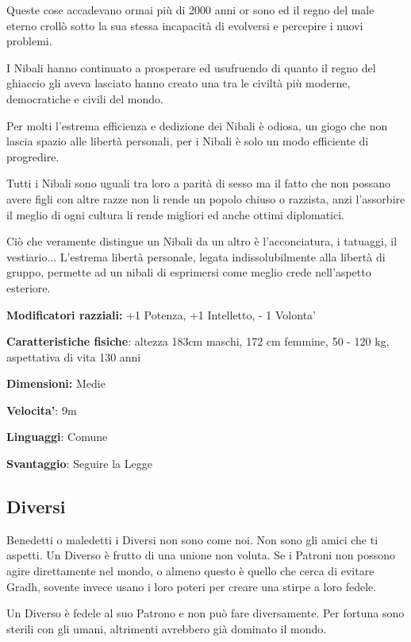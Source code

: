 \documentclass[a4paper,11pt,twoside,openany]{book}
\begin{document}
Queste cose accadevano ormai più di 2000 anni or sono ed il regno del male eterno crollò sotto la sua stessa incapacità di evolversi e percepire i nuovi problemi.

I Nibali hanno continuato a prosperare ed usufruendo di quanto il regno del ghiaccio gli aveva lasciato hanno creato una tra le civiltà più moderne, democratiche e civili del mondo.

Per molti l'estrema efficienza e dedizione dei Nibali è odiosa, un giogo che non lascia spazio alle libertà personali, per i Nibali è solo un modo efficiente di progredire.

Tutti i Nibali sono uguali tra loro a parità di sesso ma il fatto che non possano avere figli con altre razze non li rende un popolo chiuso o razzista, anzi l'assorbire il meglio di ogni cultura li rende migliori ed anche ottimi diplomatici.

Ciò che veramente distingue un Nibali da un altro è l'acconciatura, i tatuaggi, il vestiario... L'estrema libertà personale, legata indissolubilmente alla libertà di gruppo, permette ad un nibali di esprimersi come meglio crede nell'aspetto esteriore.

\textbf{Modificatori razziali:} +1 Potenza, +1 Intelletto, - 1 Volonta'

\textbf{Caratteristiche fisiche}: altezza 183cm maschi, 172 cm femmine, 50 - 120 kg, aspettativa di vita 130 anni

\textbf{Dimensioni:} Medie

\textbf{Velocita'}: 9m

\textbf{Linguaggi}: Comune

\textbf{Svantaggio}: Seguire la Legge

\subsection{Diversi}

\label{diversi}

Benedetti o maledetti i Diversi non sono come noi. Non sono gli amici che ti aspetti. Un Diverso è frutto di una unione non voluta. Se i Patroni non possono agire direttamente nel mondo, o almeno questo è quello che cerca di evitare Gradh, sovente invece usano i loro poteri per creare una stirpe a loro fedele.

Un Diverso è fedele al suo Patrono e non può fare diversamente. Per fortuna sono sterili con gli umani, altrimenti avrebbero già dominato il mondo.
\end{document}

